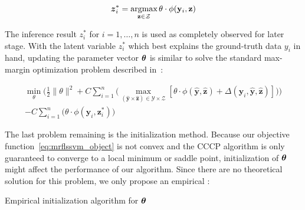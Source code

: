 \begin{align}
  {\boldsymbol{z}}_i^*=\mathop{\textrm{argmax}}_{\mathbf{z} \in \mathcal{Z}} \theta \cdot
  \phi(\mathbf{y}_i,\mathbf{z})
\end{align}

The inference result $z_i^*$ for $i=1,\dots,n$ is used as
completely observed for later stage. With the latent variable
$z_i^*$ which best explains the ground-truth data $y_i$ in hand,
updating the parameter vector $\boldsymbol{\theta}$ is similar to solve the
standard max-margin optimization problem described
in~\cite{gouldlearning}:

\begin{align}
\label{eq:mrflssvm_object}
  \min_\theta\bigg(\frac{1}{2}\|\theta\|^2+
  C\sum_{i=1}^{n}\big(\max_{(\mathbf{\hat{y}} \times
  \mathbf{\hat{z}}) \in \mathcal{Y} \times \mathcal{Z}}
  [\theta\cdot\phi(\mathbf{\hat{y}},\mathbf{\hat{z}}) +
  \Delta(\mathbf{y}_i,\mathbf{\hat{y}},\mathbf{\hat{z}})]\big)\bigg)\\
  -C\sum_{i=1}^{n}\big(\theta \cdot
  \phi(\mathbf{y}_i,\mathbf{z}_i^*)\big) \nonumber
\end{align}

The last problem remaining is the initialization method. Because
our objective function~\eqref{eq:mrflssvm_object} is not convex
and the CCCP algorithm is only guaranteed to converge to a local
minimum or saddle point\cite{yuille2002concave}, initialization
of $\boldsymbol{\theta}$ might affect the performance of our algorithm. Since
there are no theoretical solution for this problem, we only
propose an empirical :

\begin{algorithm}[ht]
  \begin{algorithmic}[1]
       
    \ENDIF
    \ENDFOR
     
  \end{algorithmic}
  \caption{\label{alg:init_theta} Empirical initialization
    algorithm for $\boldsymbol{\theta}$}
\end{algorithm}

